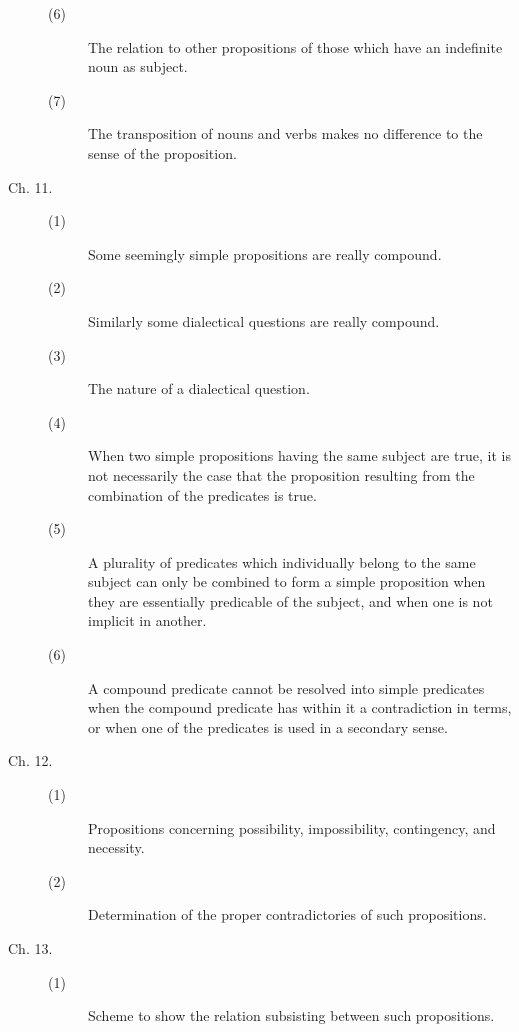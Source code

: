 \begin{description}
\begin{description}
\item[(6)] The relation to other propositions of those which have an indefinite noun as subject. 

\item[(7)] The transposition of nouns and verbs makes no difference to the 
sense of the proposition. 

\end{description}

\item[Ch. 11.]

\begin{description}
 \item[(1)] Some seemingly simple propositions are really compound. 

\item[(2)] Similarly some dialectical questions are really compound. 

\item[(3)] The nature of a dialectical question. 

\item[(4)] When two simple propositions having the same subject are true, 
it is not necessarily the case that the proposition resulting from 
the combination of the predicates is true. 

\item[(5)] A plurality of predicates which individually belong to the same 
subject can only be combined to form a simple proposition when 
they are essentially predicable of the subject, and when one is 
not implicit in another. 

\item[(6)] A compound predicate cannot be resolved into simple predicates 
when the compound predicate has within it a contradiction in 
terms, or when one of the predicates is used in a secondary sense. 
\end{description}

\item[Ch. 12.]
\begin{description}
 \item[(1)] Propositions concerning possibility, impossibility, contingency, and necessity. 
\item[(2)] Determination of the proper contradictories of such propositions. 
\end{description}

\item[Ch. 13.]
\begin{description}
 \item[(1)] Scheme to show the relation subsisting between such 
propositions. 


\end{description}
\end{description}
